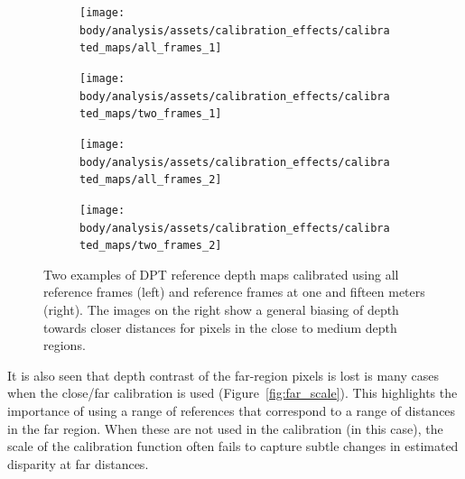 \begin{figure}[H]
    \centering
    \begin{subfigure}[t]{0.48\textwidth}
        \centering
        \texttt{[image: body/analysis/assets/calibration\_effects/calibrated\_maps/all\_frames\_1]}
    \end{subfigure}
    \begin{subfigure}[t]{0.48\textwidth}
        \centering
        \texttt{[image: body/analysis/assets/calibration\_effects/calibrated\_maps/two\_frames\_1]}
    \end{subfigure}
    
    \vspace{5mm}

    \begin{subfigure}[t]{0.48\textwidth}
        \centering
        \texttt{[image: body/analysis/assets/calibration\_effects/calibrated\_maps/all\_frames\_2]}
    \end{subfigure}
    \begin{subfigure}[t]{0.48\textwidth}
        \centering
        \texttt{[image: body/analysis/assets/calibration\_effects/calibrated\_maps/two\_frames\_2]}
    \end{subfigure}

    \caption{Two examples of DPT reference depth maps calibrated using all reference frames
        (left) and reference frames at one and fifteen meters (right). The images on the right
        show a general biasing of depth towards closer distances for pixels in the close to medium
        depth regions.}
    \label{fig:calibrated_maps}
\end{figure}

It is also seen that depth contrast of the far-region pixels is lost is many cases when the
close/far calibration is used (Figure~\ref{fig:far_scale}).
This highlights the importance of using a range of references that correspond to a range of
distances in the far region.
When these are not used in the calibration (in this case), the scale of the calibration function
often fails to capture subtle changes in estimated disparity at far distances.


